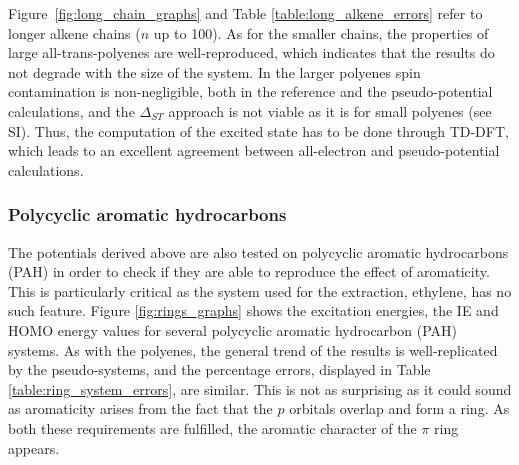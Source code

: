 \documentclass[12pt]{article}
\begin{document}
Figure~\ref{fig:long_chain_graphs} and Table \ref{table:long_alkene_errors} refer to longer 
alkene chains (\(n\) up to 100).
As for the smaller chains, the properties of large all-trans-polyenes are well-reproduced,
which indicates that the results do not degrade with the size of the system.
In the larger polyenes spin contamination is non-negligible, both in the reference and the pseudo-potential calculations, and the $\Delta_{ST}$ approach is not viable as it is for small polyenes (see SI).
Thus, the computation of the excited state has to be done through TD-DFT, which leads to an excellent agreement between all-electron and pseudo-potential calculations.

\subsubsection*{\sffamily \large Polycyclic aromatic hydrocarbons}

The potentials derived above are also tested on polycyclic aromatic hydrocarbons (PAH)
in order to check if they are able to reproduce the effect of aromaticity.
This is particularly critical as the system used for the extraction, ethylene, has no such feature.
Figure \ref{fig:rings_graphs} shows the excitation energies, the IE and
HOMO energy values for several polycyclic aromatic hydrocarbon (PAH) systems.
As with the polyenes, the general trend of the results is well-replicated
by the pseudo-systems, and the percentage errors, displayed in Table
\ref{table:ring_system_errors}, are similar.
This is not as surprising as it could sound as aromaticity arises from the fact that
the $p$ orbitals overlap and form a ring.
As both these requirements are fulfilled, the aromatic character of the $\pi$ ring
appears.
\end{document}

